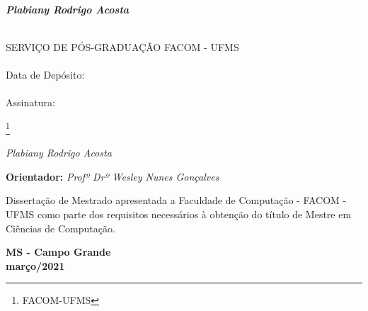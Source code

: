 \begin{titlepage}


\ \vfill

\begin{center}
\begin{minipage}[c]{12cm}
\begin{center}
\hrulefill\\
\vspace{.5cm} {\Large \titulo}\\
\vspace{1.3cm}
\textbf{\it Plabiany Rodrigo Acosta}\\
\vspace{.5cm}
\hrulefill\\
\end{center}
\end{minipage}
\end{center}

\vfill

\cleardoublepage


\begin{flushright}
\begin{Sbox}
\begin{minipage}{8.5cm}
\footnotesize
SERVIÇO DE  PÓS-GRADUAÇÃO FACOM - UFMS\\
\\
Data de Depósito: \\
\\
Assinatura:\hrulefill
\end{minipage}
\end{Sbox}
\fbox{\TheSbox}
\end{flushright}


\vspace*{2cm}
\begin{center}
{\huge\sf \titulo}\footnote{FACOM-UFMS}


\vspace*{2cm}

{\it Plabiany Rodrigo Acosta}

\vspace*{2cm}


{\bf Orientador:}  {\it Profº Drº Wesley Nunes Gonçalves}

\end{center}

\vspace*{4cm}

\begin{flushright}
\begin{minipage}{10cm}
Dissertação de Mestrado apresentada a Faculdade de Computação - FACOM - UFMS como parte dos requisitos necessários à obtenção do título de Mestre em Ciências de Computação.
\end{minipage}
\end{flushright}

\vspace*{2cm}
\begin{center}
\textbf{MS - Campo Grande \\março/2021}
\end{center}
\cleardoublepage



\end{titlepage}
